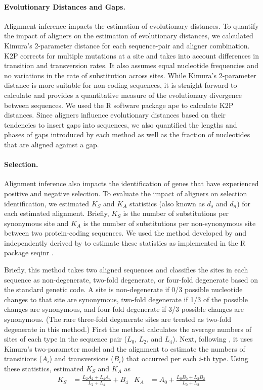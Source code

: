 \documentclass[12pt,letterpaper]{article}
\begin{document}
\paragraph{Evolutionary Distances and Gaps.}

Alignment inference impacts the estimation of evolutionary distances. To quantify the impact of aligners on the estimation of evolutionary distances, we calculated Kimura's 2-parameter distance \citep[K2P;][]{kimura1980simple} for each sequence-pair and aligner combination. K2P corrects for multiple mutations at a site and takes into account differences in transition and transversion rates. It also assumes equal nucleotide frequencies and no variations in the rate of substitution across sites. While Kimura's 2-parameter distance is more suitable for non-coding sequences, it is straight forward to calculate and provides a quantitative measure of the evolutionary divergence between sequences. We used the R software package ape \citep{paradis2019ape} to calculate K2P distances.
%
Since aligners influence evolutionary distances based on their tendencies to insert gaps into sequences, we also quantified the lengths and phases of gaps introduced by each method as well as the fraction of nucleotides that are aligned against a gap.

\paragraph{Selection.}
Alignment inference also impacts the identification of genes that have experienced positive and negative selection. To evaluate the impact of aligners on selection identification, we estimated $K_S$ and $K_A$ statistics (also known as $d_s$ and $d_n$) for each estimated alignment. Briefly, $K_S$ is the number of substitutions per synonymous site and $K_A$ is the number of substitutions per non-synonymous site between two protein-coding sequences. We used the method developed by \cite{ka_ks_li_1993} and independently derived by \cite{Pamilo1993} to estimate these statistics as implemented in the R package seqinr \citep{seqinr}. 

Briefly, this method takes two aligned sequences and classifies the sites in each sequence as non-degenerate, two-fold degenerate, or four-fold degenerate based on the standard genetic code. A site is non-degenerate if 0/3 possible nucleotide changes to that site are synonymous, two-fold degenerate if 1/3 of the possible changes are synonymous, and four-fold degenerate if 3/3 possible changes are synonymous. (The rare three-fold degenerate sites are treated as two-fold degenerate in this method.) First the method calculates the average numbers of sites of each type in the sequence pair ($L_0$, $L_2$, and $L_4$). Next, following \cite{Li1985}, it uses Kimura's two-parameter model \citep{kimura1980simple} and the alignment to estimate the numbers of transitions ($A_i$) and transversions ($B_i$) that occurred per each $i$-th type. Using these statistics, \cite{ka_ks_li_1993} estimated $K_S$ and $K_A$ as
\begin{align*}
K_S &= \frac{L_2 A_2 + L_4 A_4}{L_2 + L_4} + B_4 &
K_A &= A_0 + \frac{L_0 B_0 + L_2 B_2}{L_0 + L_2}
\end{align*}
\end{document}
